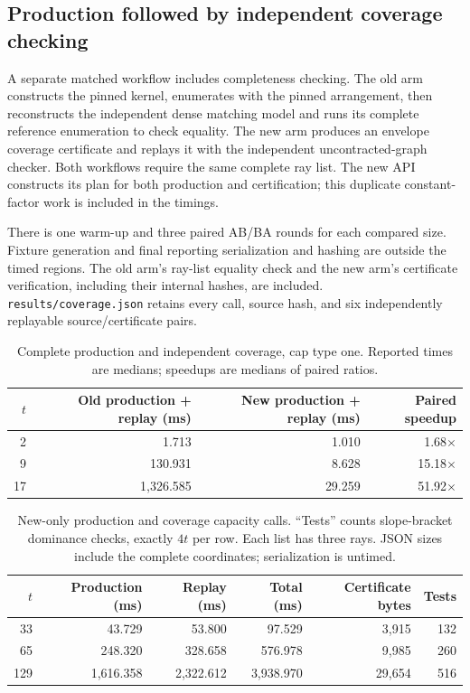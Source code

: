 \subsection{Production followed by independent coverage checking}

A separate matched workflow includes completeness checking. The old arm
constructs the pinned kernel, enumerates with the pinned arrangement, then
reconstructs the independent dense matching model and runs its complete
reference enumeration to check equality. The new arm produces an envelope
coverage certificate and replays it with the independent uncontracted-graph
checker. Both workflows require the same complete ray list. The new API
constructs its plan for both production and certification; this duplicate
constant-factor work is included in the timings.

There is one warm-up and three paired AB/BA rounds for each compared size.
Fixture generation and final reporting serialization and hashing are outside
the timed regions. The old arm's ray-list equality check and the new arm's
certificate verification, including their internal hashes, are included.
\texttt{results/coverage.json} retains every call, source hash, and six
independently replayable source/certificate pairs.

\begin{table}[htbp]
\centering\small
\begin{tabular}{@{}rrrr@{}}
\toprule
$t$ & Old production + replay (ms) & New production + replay (ms) & Paired speedup\\
\midrule
2 & 1.713 & 1.010 & 1.68$\times$\\
9 & 130.931 & 8.628 & 15.18$\times$\\
17 & 1,326.585 & 29.259 & 51.92$\times$\\
\bottomrule
\end{tabular}
\caption{Complete production and independent coverage, cap type one.
Reported times are medians; speedups are medians of paired ratios.}
\label{tab:coveragebench}
\end{table}

\begin{table}[htbp]
\centering\small
\begin{tabular}{@{}rrrrrr@{}}
\toprule
$t$ & Production (ms) & Replay (ms) & Total (ms) & Certificate bytes & Tests\\
\midrule
33 & 43.729 & 53.800 & 97.529 & 3,915 & 132\\
65 & 248.320 & 328.658 & 576.978 & 9,985 & 260\\
129 & 1,616.358 & 2,322.612 & 3,938.970 & 29,654 & 516\\
\bottomrule
\end{tabular}
\caption{New-only production and coverage capacity calls. ``Tests'' counts
slope-bracket dominance checks, exactly $4t$ per row. Each list has three
rays. JSON sizes include the complete coordinates; serialization is untimed.}
\label{tab:coveragecapacity}
\end{table}

